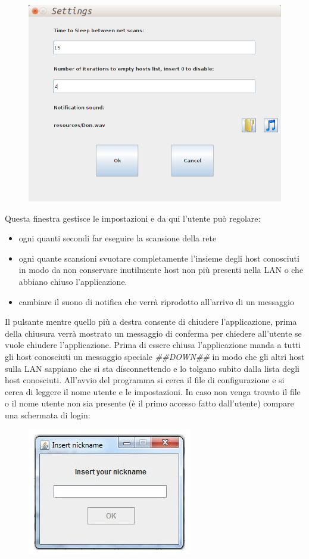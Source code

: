 \begin{figure}[h]
\centering
\includegraphics[scale=0.3]{settings.png}
\end{figure}

Questa finestra gestisce le impostazioni e da qui l'utente può regolare:
\begin{itemize}
	\item ogni quanti secondi far eseguire la scansione della rete
	\item ogni quante scansioni svuotare completamente l'insieme degli host conosciuti 
	in modo da non conservare inutilmente host non più presenti nella LAN o che abbiano
	chiuso l'applicazione.
	\item cambiare il suono di notifica che verrà riprodotto all'arrivo di un messaggio	
\end{itemize}
Il pulsante mentre quello più a destra consente di chiudere l'applicazione, prima della
chiusura verrà mostrato un messaggio di conferma per chiedere all'utente se vuole chiudere
l'applicazione. Prima di essere chiusa l'applicazione manda a tutti gli host conosciuti
un messaggio speciale \emph{\#\#DOWN\#\#} in modo che gli altri host sulla LAN sappiano che si
sta disconnettendo e lo tolgano subito dalla lista degli host conosciuti.
All'avvio del programma si cerca il file di configurazione e si cerca di
leggere il nome utente e le impostazioni. In caso non venga trovato il file o il nome utente
non sia presente (è il primo accesso fatto dall'utente) compare una schermata di login:
\begin{figure}[h]
\centering
\includegraphics[scale=0.5]{login1.jpg}
\label{fig:login}
\end{figure}

